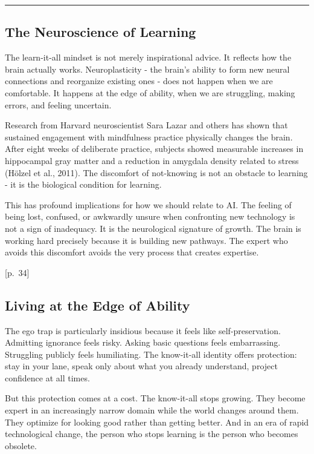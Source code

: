\documentclass[
  letterpaper,
  DIV=11,
  numbers=noendperiod]{scrreprt}
\begin{document}
\begin{center}\rule{0.5\linewidth}{0.5pt}\end{center}

\subsection{The Neuroscience of
Learning}\label{the-neuroscience-of-learning}

The learn-it-all mindset is not merely inspirational advice. It reflects
how the brain actually works. Neuroplasticity - the brain's ability to
form new neural connections and reorganize existing ones - does not
happen when we are comfortable. It happens at the edge of ability, when
we are struggling, making errors, and feeling uncertain.

Research from Harvard neuroscientist Sara Lazar and others has shown
that sustained engagement with mindfulness practice physically changes
the brain. After eight weeks of deliberate practice, subjects showed
measurable increases in hippocampal gray matter and a reduction in
amygdala density related to stress (Hölzel et al., 2011). The discomfort
of not-knowing is not an obstacle to learning - it is the biological
condition for learning.

This has profound implications for how we should relate to AI. The
feeling of being lost, confused, or awkwardly unsure when confronting
new technology is not a sign of inadequacy. It is the neurological
signature of growth. The brain is working hard precisely because it is
building new pathways. The expert who avoids this discomfort avoids the
very process that creates expertise.

{[}p.~34{]}

\subsection{Living at the Edge of
Ability}\label{living-at-the-edge-of-ability}

The ego trap is particularly insidious because it feels like
self-preservation. Admitting ignorance feels risky. Asking basic
questions feels embarrassing. Struggling publicly feels humiliating. The
know-it-all identity offers protection: stay in your lane, speak only
about what you already understand, project confidence at all times.

But this protection comes at a cost. The know-it-all stops growing. They
become expert in an increasingly narrow domain while the world changes
around them. They optimize for looking good rather than getting better.
And in an era of rapid technological change, the person who stops
learning is the person who becomes obsolete.
\end{document}
